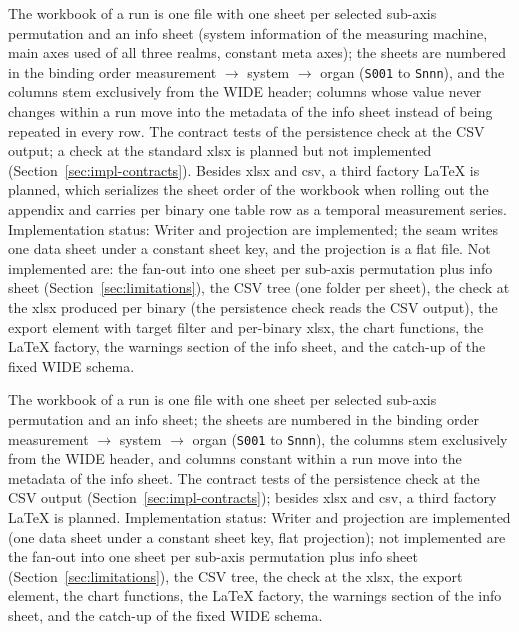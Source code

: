 \begin{nurlang}
The workbook of a run is one file with one sheet per selected sub-axis permutation and an info sheet
(system information of the measuring machine, main axes used of all three realms, constant meta
axes); the sheets are numbered in the binding order measurement $\to$ system $\to$ organ
(\texttt{S001} to \texttt{Snnn}), and the columns stem exclusively from the WIDE header; columns
whose value never changes within a run move into the metadata of the info sheet instead of being
repeated in every row. The contract tests of the persistence check at the CSV output; a check at the
standard xlsx is planned but not implemented (Section~\ref{sec:impl-contracts}). Besides xlsx and
csv, a third factory LaTeX is planned, which serializes the sheet order of the workbook when rolling
out the appendix and carries per binary one table row as a temporal measurement series.
Implementation status: Writer and projection are implemented; the seam writes one data sheet under a
constant sheet key, and the projection is a flat file. Not implemented are: the fan-out into one
sheet per sub-axis permutation plus info sheet (Section~\ref{sec:limitations}), the CSV tree (one
folder per sheet), the check at the xlsx produced per binary (the persistence check reads the CSV
output), the export element with target filter and per-binary xlsx, the chart functions, the LaTeX
factory, the warnings section of the info sheet, and the catch-up of the fixed WIDE schema.
\end{nurlang}
\begin{nurkurz}
The workbook of a run is one file with one sheet per selected sub-axis permutation and an info sheet; the
sheets are numbered in the binding order measurement $\to$ system $\to$ organ (\texttt{S001} to
\texttt{Snnn}), the columns stem exclusively from the WIDE header, and columns constant within a run move
into the metadata of the info sheet. The contract tests of the persistence check at the CSV output
(Section~\ref{sec:impl-contracts}); besides xlsx and csv, a third factory LaTeX is planned. Implementation
status: Writer and projection are implemented (one data sheet under a constant sheet key, flat projection);
not implemented are the fan-out into one sheet per sub-axis permutation plus info sheet
(Section~\ref{sec:limitations}), the CSV tree, the check at the xlsx, the export element, the chart
functions, the LaTeX factory, the warnings section of the info sheet, and the catch-up of the fixed WIDE
schema.
\end{nurkurz}

